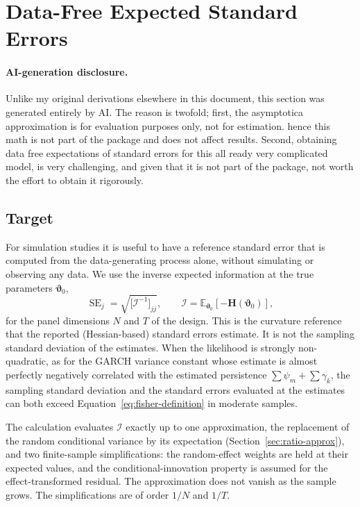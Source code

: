 \documentclass[12pt]{article}
\begin{document}
\section{Data-Free Expected Standard Errors}\label{sec:fisher-information}

\paragraph{AI-generation disclosure.}
Unlike my original derivations elsewhere in this document, this section was generated entirely by AI. 
The reason is twofold; first, the asymptotica approximation is for evaluation purposes only, not for estimation. hence this math is not 
part of the package and does not affect results. Second, obtaining data free expectations of standard errors for this all ready 
very complicated model, is very challenging, and given that it is not part of the package, not worth the effort to obtain it rigorously. 

\subsection{Target}
For simulation studies it is useful to have a reference standard error that is computed from the data-generating process alone, without simulating or observing any data. We use the inverse expected information at the true parameters $\boldsymbol\vartheta_0$,
\begin{equation}
\operatorname{SE}_j=\sqrt{\big[\mathcal I^{-1}\big]_{jj}},\qquad
\mathcal I=\mathbb E_{\boldsymbol\vartheta_0}\!\left[-\mathbf H(\boldsymbol\vartheta_0)\right],
\label{eq:fisher-definition}
\end{equation}
for the panel dimensions $N$ and $T$ of the design. This is the curvature reference that the reported (Hessian-based) standard errors estimate. It is not the sampling standard deviation of the estimates. When the likelihood is strongly non-quadratic, as for the GARCH variance constant whose estimate is almost perfectly negatively correlated with the estimated persistence $\sum\psi_m+\sum\gamma_k$, the sampling standard deviation and the standard errors evaluated at the estimates can both exceed Equation~\ref{eq:fisher-definition} in moderate samples.

The calculation evaluates $\mathcal I$ exactly up to one approximation, the replacement of the random conditional variance by its expectation (Section~\ref{sec:ratio-approx}), and two finite-sample simplifications: the random-effect weights are held at their expected values, and the conditional-innovation property is assumed for the effect-transformed residual. The approximation does not vanish as the sample grows. The simplifications are of order $1/N$ and $1/T$.
\end{document}
